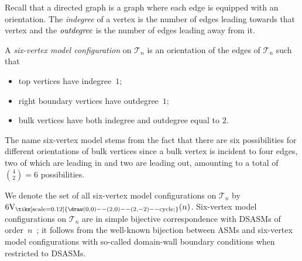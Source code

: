 \documentclass[ALCO, Unicode]{cedram}
\newcommand{\deff}[1]{\emph{#1}}
\newcommand{\DSASMSym}{
	\tikz[scale=0.12]{
		\draw (0,0) -- (2,0) -- (2,-2) -- cycle;
	}
}
\DeclareMathOperator{\SV}{6V_{\DSASMSym}}
\begin{document}
	Recall that a directed graph is a graph where each edge is equipped with an orientation. The \deff{indegree} of a vertex is the number of edges leading towards that vertex and the $\deff{outdegree}$ is the number of edges leading away from it.
	
	\begin{dfn}
		A \deff{six-vertex model configuration} on $\mathcal{T}_n$ 
		is an orientation of the edges of $\mathcal{T}_n$ such that
		\begin{itemize}
			\item top vertices have indegree~$1$;
			\item right boundary vertices have outdegree~$1$;
			\item bulk vertices have both indegree and outdegree equal to $2$.
		\end{itemize}
	\end{dfn}
	
	The name six-vertex model stems from the fact that there are six possibilities for different orientations of bulk vertices since a bulk vertex is incident to four edges, two of which are leading in and two are leading out, amounting to a total of $\binom{4}{2}=6$ possibilities.
	
	We denote the set of all six-vertex model configurations on $\mathcal{T}_n$ by $\SV(n)$. Six-vertex model configurations on $\mathcal{T}_n$ are in simple bijective correspondence with DSASMs of order~$n$~\cite{BFK23}; it follows from the well-known bijection between ASMs and six-vertex model configurations
	with so-called domain-wall boundary conditions when restricted to DSASMs.
	
\end{document}
